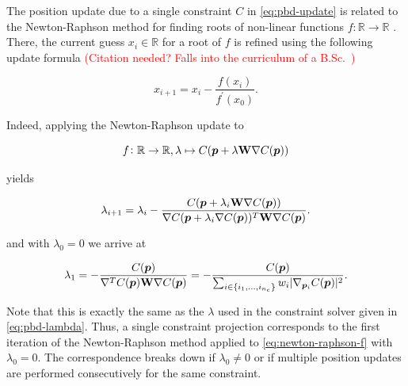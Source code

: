 The position update due to a single constraint $C$ in \autoref{eq:pbd-update} is related to the Newton-Raphson method for finding roots of non-linear 
functions $f \colon \mathbb{R} \to \mathbb{R}$ \cite{mueller2006}. There, the current guess $x_i \in \mathbb{R}$ for a root of $f$ is refined 
using the following update formula \textcolor{red}{(Citation needed? Falls into the curriculum of a B.Sc.\ )}

\begin{equation}\label{eq:newton-raphson}
    x_{i+1} = x_i - \frac{f(x_i)}{f^{\prime}(x_0)}.
\end{equation}

\noindent Indeed, applying the Newton-Raphson update to 

\begin{equation}\label{eq:newton-raphson-f}
    f \colon \mathbb{R} \to \mathbb{R}, \lambda \mapsto C(\bm{p} + \lambda \mathbf{W} \nabla C(\bm{p}))
\end{equation}

\noindent yields

\[
    \lambda_{i+1} = \lambda_i - \frac{C(\bm{p} + \lambda_i \mathbf{W} \nabla C(\bm{p}))}
    {\nabla C(\bm{p} + \lambda_i \nabla C(\bm{p}))^T \mathbf{W} \nabla C(\bm{p})}.
\]

\noindent and with $\lambda_0 = 0$ we arrive at 

\[
    \lambda_1 = -\frac{C(\bm{p})}{\nabla^T C(\bm{p}) \mathbf{W} \nabla C(\bm{p})}
    = - \frac{C(\bm{p})}{\sum_{i \in \{ i_1, \ldots, i_{n_c} \}} w_i \vert \nabla_{\bm{p}_i} C(\bm{p}) \vert^2}.
\]

\noindent Note that this is exactly the same as the $\lambda$ used in the constraint solver given in \autoref{eq:pbd-lambda}. Thus, a single 
constraint projection corresponds to the first iteration of the Newton-Raphson method applied to \autoref{eq:newton-raphson-f} with 
$\lambda_0 = 0$. The correspondence breaks down if $\lambda_0 \neq 0$ or if multiple position updates are performed consecutively for the 
same constraint.

